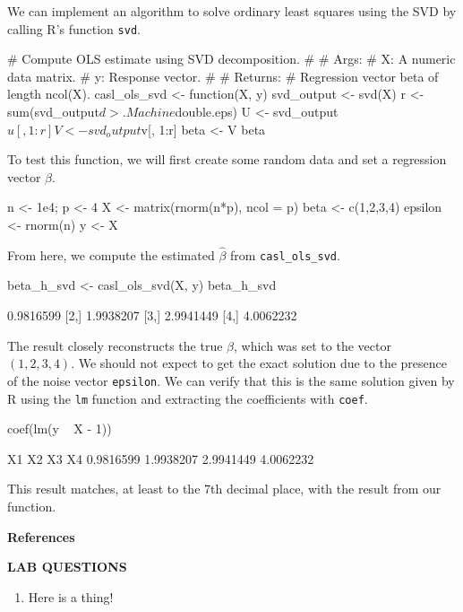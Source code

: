 \documentclass[12pt,hidelinks]{article}
\newcommand{\code}[1]{\texttt{#1}}
\numberwithin{equation}{section}
\begin{document}
We can implement an algorithm to solve ordinary least squares using the SVD
by calling R's function \code{svd}.
\begin{rcode}
# Compute OLS estimate using SVD decomposition.
#
# Args:
#     X: A numeric data matrix.
#     y: Response vector.
#
# Returns:
#     Regression vector beta of length ncol(X).
casl_ols_svd  <-
function(X, y)
{
  svd_output <- svd(X)
  r <- sum(svd_output$d > .Machine$double.eps)
  U <- svd_output$u[, 1:r]
  V <- svd_output$v[, 1:r]
  beta <- V %
  beta
}
\end{rcode}
To test this function, we will first create some random data and set a
regression vector $\beta$.
\begin{rcode}
n <- 1e4; p <- 4
X <- matrix(rnorm(n*p), ncol = p)
beta <- c(1,2,3,4)
epsilon <- rnorm(n)
y <- X %
\end{rcode}
From here, we compute the estimated $\widehat{\beta}$ from \code{casl\_ols\_svd}.
\begin{rcode}
beta_h_svd <- casl_ols_svd(X, y)
beta_h_svd
\end{rcode}
\begin{rres}
          [,1]
[1,] 0.9816599
[2,] 1.9938207
[3,] 2.9941449
[4,] 4.0062232
\end{rres}
The result closely reconstructs the true $\beta$, which was set to the
vector $(1, 2, 3, 4)$. We should not expect to get the exact solution
due to the presence of the noise vector \texttt{epsilon}. We can verify that this
is the same solution given by R using the \code{lm} function and extracting
the coefficients with \code{coef}.
\begin{rcode}
coef(lm(y ~ X - 1))
\end{rcode}
\begin{rres}
       X1        X2        X3        X4
0.9816599 1.9938207 2.9941449 4.0062232
\end{rres}
This result matches, at least to the 7th decimal place, with the result from
our function.

\renewcommand{\section}[2]{}%
\vspace{12pt}
\textbf{References}


\newpage

\textbf{LAB QUESTIONS}

\vspace*{0pt}

\begin{enumerate}
\item Here is a thing!
\end{enumerate}
\end{document}
